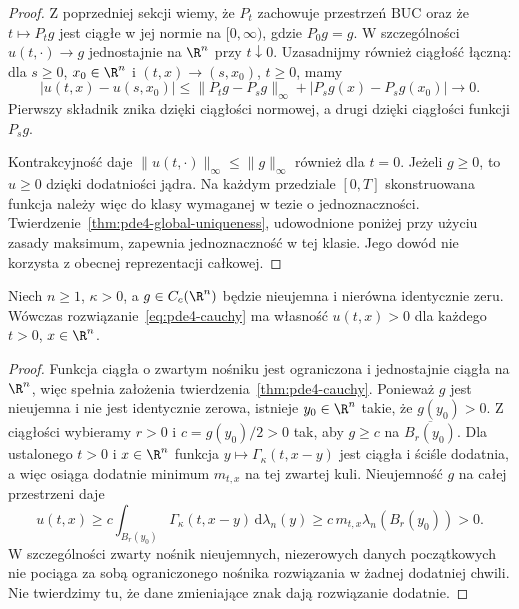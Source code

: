 \begin{proof}
Z poprzedniej sekcji wiemy, że $P_t$ zachowuje
przestrzeń $\mathrm{BUC}$ oraz że $t\mapsto P_tg$
jest ciągłe w jej normie na $[0,\infty)$,
gdzie $P_0g=g$. W szczególności $u(t,\cdot)\to g$
jednostajnie na $\R^n$ przy $t\downarrow0$.
Uzasadnijmy również ciągłość łączną: dla $s\geq0$,
$x_0\in\R^n$ i $(t,x)\to(s,x_0)$, $t\geq0$, mamy
\[
 |u(t,x)-u(s,x_0)|\leq
 \|P_tg-P_sg\|_\infty+
 |P_sg(x)-P_sg(x_0)|\longrightarrow0.
\]
Pierwszy składnik znika dzięki ciągłości normowej,
a drugi dzięki ciągłości funkcji $P_sg$.

Kontrakcyjność daje $\|u(t,\cdot)\|_\infty\leq\|g\|_\infty$
również dla $t=0$. Jeżeli $g\geq0$, to $u\geq0$
dzięki dodatniości jądra. Na każdym przedziale
$[0,T]$ skonstruowana funkcja należy więc do klasy
wymaganej w tezie o jednoznaczności.
Twierdzenie~\ref{thm:pde4-global-uniqueness},
udowodnione poniżej przy użyciu zasady maksimum,
zapewnia jednoznaczność w tej klasie. Jego dowód
nie korzysta z obecnej reprezentacji całkowej.
\end{proof}

\begin{wniosek}
\label{cor:pde4-positive}
Niech $n\geq1$, $\kappa>0$, a
$g\in C_c(\R^n)$ będzie nieujemna i nierówna identycznie
zeru. Wówczas rozwiązanie~\eqref{eq:pde4-cauchy}
ma własność $u(t,x)>0$ dla każdego $t>0$, $x\in\R^n$.
\end{wniosek}
\begin{proof}
Funkcja ciągła o zwartym nośniku jest ograniczona
i jednostajnie ciągła na $\R^n$, więc spełnia
założenia twierdzenia~\ref{thm:pde4-cauchy}.
Ponieważ $g$ jest nieujemna i nie jest identycznie
zerowa, istnieje $y_0\in\R^n$ takie, że $g(y_0)>0$.
Z ciągłości wybieramy $r>0$ i $c=g(y_0)/2>0$
tak, aby $g\geq c$ na $\overline{B_r(y_0)}$.
Dla ustalonego $t>0$ i $x\in\R^n$ funkcja
$y\mapsto\Gamma_\kappa(t,x-y)$ jest ciągła
i ściśle dodatnia, a więc osiąga dodatnie minimum
$m_{t,x}$ na tej zwartej kuli.
Nieujemność $g$ na całej przestrzeni daje
\[
 u(t,x)\geq c\int_{B_r(y_0)}
 \Gamma_\kappa(t,x-y)\,\mathrm d\lambda_n(y)
 \geq c\,m_{t,x}\lambda_n(B_r(y_0))>0.
\]
W szczególności zwarty nośnik nieujemnych,
niezerowych danych początkowych nie pociąga
za sobą ograniczonego nośnika rozwiązania
w żadnej dodatniej chwili. Nie twierdzimy tu,
że dane zmieniające znak dają rozwiązanie dodatnie.
\end{proof}

